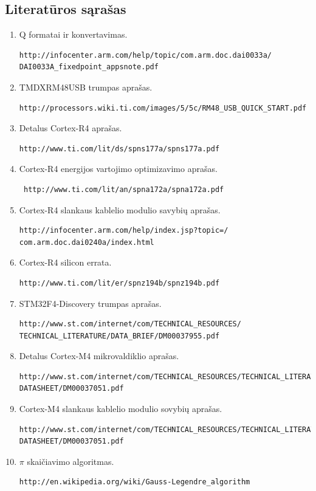 \documentclass[a4paper, 12pt]{article} %
\begin{document}
\begin{onehalfspacing}
\section*{Literat\={u}ros s\k{a}ra\v{s}as}
\begin{enumerate}
\item  Q formatai ir konvertavimas. \begin{verbatim}http://infocenter.arm.com/help/topic/com.arm.doc.dai0033a/
DAI0033A_fixedpoint_appsnote.pdf\end{verbatim}
\item TMDXRM48USB trumpas apra\v{s}as. \begin{verbatim}http://processors.wiki.ti.com/images/5/5c/RM48_USB_QUICK_START.pdf\end{verbatim}
\item Detalus Cortex-R4 apra\v{s}as. \begin{verbatim}http://www.ti.com/lit/ds/spns177a/spns177a.pdf\end{verbatim}
\item Cortex-R4 energijos vartojimo optimizavimo apra\v{s}as.\begin{verbatim} http://www.ti.com/lit/an/spna172a/spna172a.pdf\end{verbatim}
\item Cortex-R4 slankaus kablelio modulio savybi\k{u} apra\v{s}as. \begin{verbatim}http://infocenter.arm.com/help/index.jsp?topic=/
com.arm.doc.dai0240a/index.html\end{verbatim}
\item Cortex-R4 silicon errata. \begin{verbatim}
http://www.ti.com/lit/er/spnz194b/spnz194b.pdf \end{verbatim}
\item STM32F4-Discovery trumpas apra\v{s}as. \begin{verbatim}http://www.st.com/internet/com/TECHNICAL_RESOURCES/
TECHNICAL_LITERATURE/DATA_BRIEF/DM00037955.pdf\end{verbatim}
\item Detalus Cortex-M4 mikrovaldiklio apra\v{s}as. \begin{verbatim}http://www.st.com/internet/com/TECHNICAL_RESOURCES/TECHNICAL_LITERATURE/
DATASHEET/DM00037051.pdf\end{verbatim}
\item Cortex-M4 slankaus kablelio modulio sovybi\k{u} apra\v{s}as. \begin{verbatim}http://www.st.com/internet/com/TECHNICAL_RESOURCES/TECHNICAL_LITERATURE/
DATASHEET/DM00037051.pdf\end{verbatim}
\item $\pi$ skai\v{c}iavimo algoritmas. \begin{verbatim}http://en.wikipedia.org/wiki/Gauss-Legendre_algorithm\end{verbatim}
\end{enumerate}


\end{onehalfspacing}
\end{document}
